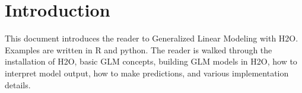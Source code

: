 \newpage

\tableofcontents


\newpage

\section{Introduction}
This document introduces the reader to Generalized Linear Modeling with H2O.  Examples are written in R and python.
The reader is walked through the installation of H2O, basic GLM concepts, building GLM models in H2O, how to
interpret model output, how to make predictions, and various implementation details.





\newpage

%

